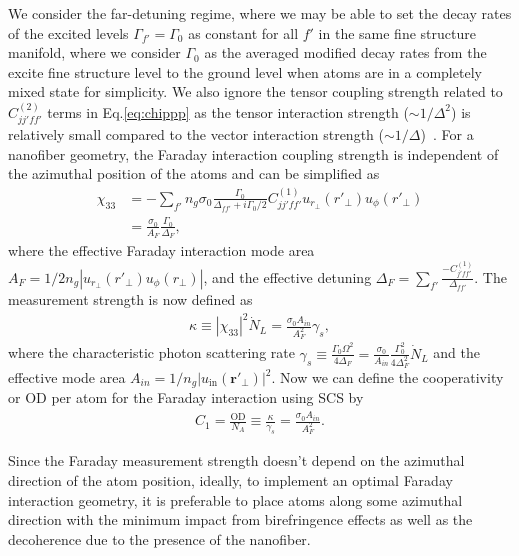 \documentclass[aps,pra,twocolumn,superscriptaddress]{revtex4-1} %
\def\br{\mathbf{r}}
\begin{document}
We consider the far-detuning regime, where we may be able to set the decay rates of the excited levels $ \Gamma_{f'}= \Gamma_0$ as constant for all $ f' $ in the same fine structure manifold, where we consider $ \Gamma_0 $ as the averaged modified decay rates from the excite fine structure level to the ground level when atoms are in a completely mixed state for simplicity.
We also ignore the tensor coupling strength related to $ C_{jj'ff'}^{(2)} $ terms in Eq.\eqref{eq:chippp} as the tensor interaction strength ($ \sim 1/\Delta^2 $) is relatively small compared to the vector interaction strength ($ \sim 1/\Delta $)~\cite{Deutsch2010a}. 
For a nanofiber geometry, the Faraday interaction coupling strength is independent of the azimuthal position of the atoms and can be simplified as
\begin{align}
\chi_{33} &= -\sum_{f'}n_g\sigma_0\frac{\Gamma_0}{\Delta_{ff'}+i\Gamma_0/2}C_{jj'ff'}^{(1)}u_{r\!_\perp}(r'\!_\perp)u_\phi(r'\!_\perp)\\
&=\frac{\sigma_0}{A_F}\frac{\Gamma_0}{\Delta_F},
\end{align}
where the effective Faraday interaction mode area $ A_F=1/2n_g|u_{r\!_\perp}(r'\!_\perp)u_\phi(r\!_\perp)| $, and the effective detuning $ \Delta_F=\sum_{f'}\frac{-C_{j'ff'}^{(1)}}{\Delta_{ff'}} $.
The measurement strength is now defined as
\begin{align}
\kappa\equiv|\chi_{33}|^2\dot{N}_L=\frac{\sigma_0A_{in}}{A_F^2}\gamma_s,
\end{align}
where the characteristic photon scattering rate $ \gamma_s\equiv \frac{\Gamma_0\Omega^2}{4\Delta_F}=\frac{\sigma_0}{A_{in}}\frac{\Gamma_0^2}{4\Delta_F^2}\dot{N}_L $ and the effective mode area $ A_{in}=1/n_g|u_{\mathrm{in}}(\br'\!_\perp)|^2 $.
Now we can define the cooperativity or OD per atom for the Faraday interaction using SCS by
\begin{align}
C_1=\frac{\mathrm{OD}}{N_A} \equiv \frac{\kappa}{\gamma_s}=\frac{\sigma_0A_{in}}{A_F^2}.
\end{align}

Since the Faraday measurement strength doesn't depend on the azimuthal direction of the atom position, ideally, to implement an optimal Faraday interaction geometry, it is preferable to place atoms along some azimuthal direction with the minimum impact from birefringence effects as well as the decoherence due to the presence of the nanofiber. 
\end{document}
